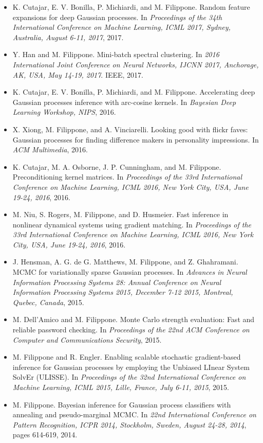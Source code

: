 \begin{itemize}
\item  K. Cutajar, E. V. Bonilla, P. Michiardi, and M. Filippone. Random feature expansions for deep Gaussian processes. In \emph{Proceedings of the 34th International Conference on Machine Learning, ICML 2017, Sydney, Australia, August 6-11, 2017}, 2017. 
\item  Y. Han and M. Filippone. Mini-batch spectral clustering. In \emph{2016 International Joint Conference on Neural Networks, IJCNN 2017, Anchorage, AK, USA, May 14-19, 2017}. IEEE, 2017. 
\item  K. Cutajar, E. V. Bonilla, P. Michiardi, and M. Filippone. Accelerating deep Gaussian processes inference with arc-cosine kernels. In \emph{Bayesian Deep Learning Workshop, NIPS}, 2016.  
\item  X. Xiong, M. Filippone, and A. Vinciarelli. Looking good with flickr faves: Gaussian processes for finding difference makers in personality impressions. In \emph{ACM Multimedia}, 2016. 
\item  K. Cutajar, M. A. Osborne, J. P. Cunningham, and M. Filippone. Preconditioning kernel matrices. In \emph{Proceedings of the 33rd International Conference on Machine Learning, ICML 2016, New York City, USA, June 19-24, 2016}, 2016. 
\item  M. Niu, S. Rogers, M. Filippone, and D. Husmeier. Fast inference in nonlinear dynamical systems using gradient matching. In \emph{Proceedings of the 33rd International Conference on Machine Learning, ICML 2016, New York City, USA, June 19-24, 2016}, 2016. 
\item  J. Hensman, A. G. de G. Matthews, M. Filippone, and Z. Ghahramani. MCMC for variationally sparse Gaussian processes. In \emph{Advances in Neural Information Processing Systems 28: Annual Conference on Neural Information Processing Systems 2015, December 7-12 2015, Montreal, Quebec, Canada}, 2015. 
\item  M. Dell'Amico and M. Filippone. Monte Carlo strength evaluation: Fast and reliable password checking. In \emph{Proceedings of the 22nd ACM Conference on Computer and Communications Security}, 2015. 
\item  M. Filippone and R. Engler. Enabling scalable stochastic gradient-based inference for Gaussian processes by employing the Unbiased LInear System SolvEr (ULISSE). In \emph{Proceedings of the 32nd International Conference on Machine Learning, ICML 2015, Lille, France, July 6-11, 2015}, 2015. 
\item  M. Filippone. Bayesian inference for Gaussian process classifiers with annealing and pseudo-marginal MCMC. In \emph{22nd International Conference on Pattern Recognition, ICPR 2014, Stockholm, Sweden, August 24-28, 2014}, pages 614-619, 2014.  

\end{itemize}
